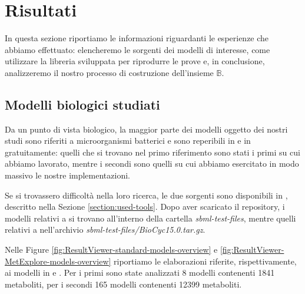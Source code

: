 \section{Risultati}
In questa sezione riportiamo le informazioni riguardanti le esperienze
che abbiamo effettuato: elencheremo le sorgenti dei modelli di
interesse, come utilizzare la libreria sviluppata per riprodurre le
prove e, in conclusione, analizzeremo il nostro processo di
costruzione dell'insieme $\mathbb{B}$.

\subsection{Modelli biologici studiati}
Da un punto di vista biologico, la maggior parte dei modelli oggetto
dei nostri studi sono riferiti a microorganismi batterici e sono
reperibili in \cite{SymBioCyc} e in \cite{MetExplore} gratuitamente:
quelli che si trovano nel primo riferimento sono stati i primi su cui
abbiamo lavorato, mentre i secondi sono quelli su cui abbiamo
esercitato in modo massivo le nostre implementazioni.

Se si trovassero difficolt\`a nella loro ricerca, le due sorgenti sono
disponibili in \cite{MyJavaImpl}, descritto nella Sezione
\ref{section:used-tools}. Dopo aver scaricato il repository, i modelli
relativi a \cite{SymBioCyc} si trovano all'interno della cartella
\emph{sbml-test-files}, mentre quelli relativi a \cite{MetExplore}
nell'archivio \emph{sbml-test-files/BioCyc15.0.tar.gz}.

Nelle Figure \ref{fig:ResultViewer-standard-models-overview} e
\ref{fig:ResultViewer-MetExplore-models-overview} riportiamo le
elaborazioni riferite, rispettivamente, ai modelli in \cite{SymBioCyc}
e \cite{MetExplore}. Per i primi sono state analizzati 8 modelli
contenenti 1841 metaboliti, per i secondi 165 modelli contenenti 12399
metaboliti.

